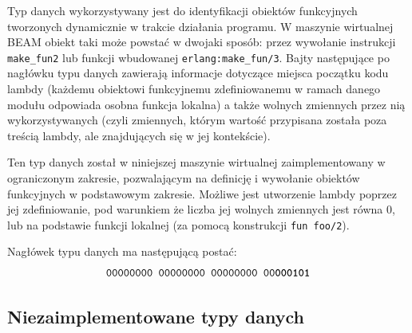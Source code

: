 Typ danych wykorzystywany jest do identyfikacji obiektów funkcyjnych tworzonych dynamicznie w trakcie działania programu.
W maszynie wirtualnej BEAM obiekt taki może powstać w dwojaki sposób: przez wywołanie instrukcji \texttt{make\_fun2} lub funkcji wbudowanej \texttt{erlang:make\_fun/3}.
Bajty następujące po nagłówku typu danych zawierają informacje dotyczące miejsca początku kodu lambdy (każdemu obiektowi funkcyjnemu zdefiniowanemu w ramach danego modułu odpowiada osobna funkcja lokalna) a także wolnych zmiennych przez nią wykorzystywanych (czyli zmiennych, którym wartość przypisana została poza treścią lambdy, ale znajdujących się w jej kontekście).

Ten typ danych został w niniejszej maszynie wirtualnej zaimplementowany w ograniczonym zakresie, pozwalającym na definicję i wywołanie obiektów funkcyjnych w podstawowym zakresie.
Możliwe jest utworzenie lambdy poprzez jej zdefiniowanie, pod warunkiem że liczba jej wolnych zmiennych jest równa 0, lub na podstawie funkcji lokalnej (za pomocą konstrukcji \texttt{fun foo/2}).

Nagłówek typu danych ma następującą postać:
$$\texttt{00000000 00000000 00000000 00\textbf{000101}}$$

\subsection{Niezaimplementowane typy danych}
\label{sub:typyNiezaimplementowane}

